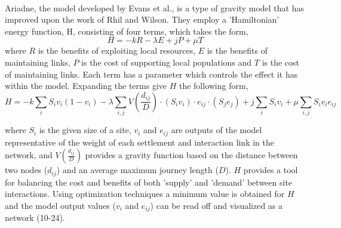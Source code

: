 \documentclass[12pt,a4paper]{thesis}
\begin{document}
\paragraph{}
Ariadne, the model developed by Evans et al., is a type of gravity model that has improved upon the work of Rhil and Wilson. They employ a 'Hamiltonian' energy function, H, consisting of four terms, which takes the form,
			\begin{equation}
			H = -kR - \lambda E + jP + \mu T
			\label{eq:simpleHam}
			\end{equation}  
where $R$ is the benefits of exploiting local resources, $E$ is the benefits of maintaining links, $P$ is the cost of supporting local populations and $T$ is the cost of maintaining links. Each term has a parameter which controls the effect it has within the model. Expanding the terms give $H$ the following form,
			\begin{equation}
			H = -k\sum_{i}S_{i}v_{i}(1-v_{i}) - \lambda\sum_{i,j}V(\frac{d_{ij}}{D})\cdot(S_{i}v_{i})\cdot e_{ij}\cdot (S_{j}e_{j}) + j\sum_{i}S_{i}v_{i} + \mu\sum_{i,j}S_{i}v_{i}e_{ij}
			\label{eq:expandedHam}
			\end{equation}

where $S_{i}$ is the given size of a site, $v_{i}$ and $e_{ij}$ are outputs of the model representative of the weight of each settlement and interaction link in the network, and $V(\frac{d_{ij}}{D})$ provides a gravity function based on the distance between two nodes ($d_{ij}$) and an average maximum journey length ($D$). $H$ provides a tool for balancing the cost and benefits of both 'supply' and 'demand' between site interactions. Using optimization techniques a minimum value is obtained for $H$ and the model output values ($v_{i}$ and $e_{ij}$) can be read off and visualized as a network (10-24). 
\end{document}

